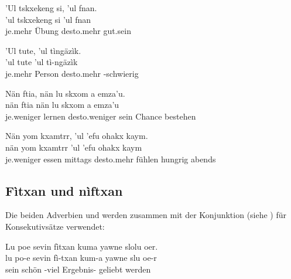 \begin{interlin}
	\glll \Npawl{}'Ul tskxekeng si, 'ul fnan. \\
	'ul tskxekeng si 'ul fnan \\
	je.mehr Übung  desto.mehr gut.sein \\
\end{interlin}

\begin{interlin}
	\glll \Npawl{}'Ul tute, 'ul tìngäzìk. \\
	'ul tute 'ul tì-ngäzìk \\
	je.mehr Person desto.mehr -schwierig \\
\end{interlin}

\begin{interlin}
	\glll \Npawl{}Nän ftia, nän lu skxom a emza'u. \\
	nän ftia nän lu skxom a emza'u \\
	je.weniger lernen desto.weniger sein Chance  bestehen \\
\end{interlin}

\begin{interlin}
	\glll \Npawl{}Nän yom kxamtrr, 'ul 'efu ohakx kaym. \\
	nän yom kxamtrr 'ul 'efu ohakx kaym \\
	je.weniger essen mittags desto.mehr fühlen hungrig abends \\
\end{interlin}
\noindent{}

\subsection{Fìtxan und nìftxan} Die beiden Adverbien  und   werden zusammen mit der Konjunktion  (siehe ) für Konsekutivsätze verwendet:

\begin{interlin}
	\glll \Npawl{}Lu poe sevin fìtxan kuma yawne slolu oer. \\
	lu po-e sevin fì-txan kum-a yawne slu oe-r \\
	sein  schön -viel Ergebnis- geliebt werden  \\
\end{interlin}

